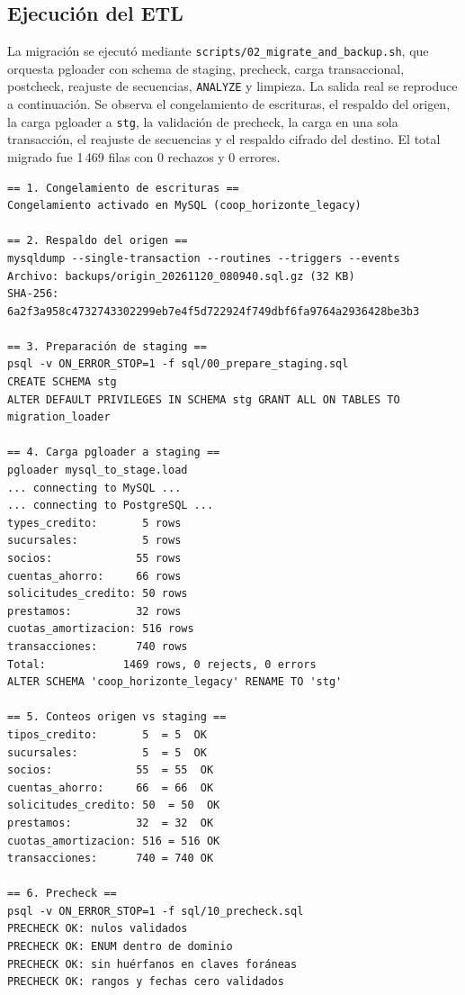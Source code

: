 \subsection{Ejecución del ETL}

La migración se ejecutó mediante \texttt{scripts/02\_migrate\_and\_backup.sh},
que orquesta pgloader con schema de staging, precheck, carga transaccional,
postcheck, reajuste de secuencias, \texttt{ANALYZE} y limpieza. La salida real
se reproduce a continuación. Se observa el congelamiento de escrituras, el
respaldo del origen, la carga pgloader a \texttt{stg}, la validación de
precheck, la carga en una sola transacción, el reajuste de secuencias y el
respaldo cifrado del destino. El total migrado fue 1\,469 filas con 0 rechazos
y 0 errores.

\begin{lstlisting}[style=terminal,caption={Salida real de la migración con pgloader + staging},label={lst:salida-etl}]
== 1. Congelamiento de escrituras ==
Congelamiento activado en MySQL (coop_horizonte_legacy)

== 2. Respaldo del origen ==
mysqldump --single-transaction --routines --triggers --events
Archivo: backups/origin_20261120_080940.sql.gz (32 KB)
SHA-256: 6a2f3a958c4732743302299eb7e4f5d722924f749dbf6fa9764a2936428be3b3

== 3. Preparación de staging ==
psql -v ON_ERROR_STOP=1 -f sql/00_prepare_staging.sql
CREATE SCHEMA stg
ALTER DEFAULT PRIVILEGES IN SCHEMA stg GRANT ALL ON TABLES TO migration_loader

== 4. Carga pgloader a staging ==
pgloader mysql_to_stage.load
... connecting to MySQL ...
... connecting to PostgreSQL ...
types_credito:       5 rows
sucursales:          5 rows
socios:             55 rows
cuentas_ahorro:     66 rows
solicitudes_credito: 50 rows
prestamos:          32 rows
cuotas_amortizacion: 516 rows
transacciones:      740 rows
Total:            1469 rows, 0 rejects, 0 errors
ALTER SCHEMA 'coop_horizonte_legacy' RENAME TO 'stg'

== 5. Conteos origen vs staging ==
tipos_credito:       5  = 5  OK
sucursales:          5  = 5  OK
socios:             55  = 55  OK
cuentas_ahorro:     66  = 66  OK
solicitudes_credito: 50  = 50  OK
prestamos:          32  = 32  OK
cuotas_amortizacion: 516 = 516 OK
transacciones:      740 = 740 OK

== 6. Precheck ==
psql -v ON_ERROR_STOP=1 -f sql/10_precheck.sql
PRECHECK OK: nulos validados
PRECHECK OK: ENUM dentro de dominio
PRECHECK OK: sin huérfanos en claves foráneas
PRECHECK OK: rangos y fechas cero validados


\end{lstlisting}
